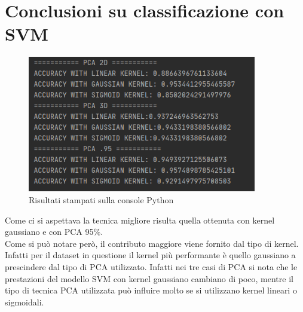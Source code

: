 \section{Conclusioni su classificazione con SVM}
\begin{figure}[h]
	\centering   	
	\includegraphics[width=100mm]{image/svmresults.png}
	\caption{Risultati stampati sulla console Python}
\end{figure}
Come ci si aspettava la tecnica migliore risulta quella ottenuta con kernel gaussiano e con PCA 95\%.\\
Come si può notare però, il contributo maggiore viene fornito dal tipo di kernel. Infatti per il dataset in questione il kernel più performante è quello gaussiano a prescindere dal tipo di PCA utilizzato. Infatti nei tre casi di PCA si nota che le prestazioni del modello SVM con kernel gaussiano cambiano di poco, mentre il tipo di tecnica PCA utilizzata può influire molto se si utilizzano kernel lineari o sigmoidali.
